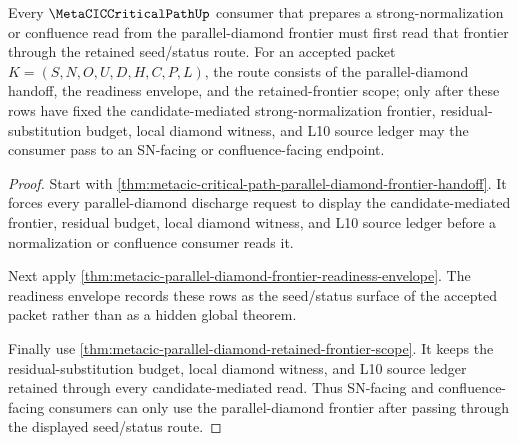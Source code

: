 \begin{theorem}
\label{thm:metacic-parallel-diamond-frontier-status-seed}
Every $\MetaCICCriticalPathUp$ consumer that prepares a strong-normalization or confluence read from the parallel-diamond frontier must first read that frontier through the retained seed/status route. For an accepted packet $K=(S,N,O,U,D,H,C,P,L)$, the route consists of the parallel-diamond handoff, the readiness envelope, and the retained-frontier scope; only after these rows have fixed the candidate-mediated strong-normalization frontier, residual-substitution budget, local diamond witness, and L10 source ledger may the consumer pass to an SN-facing or confluence-facing endpoint.
\end{theorem}
\begin{proof}
Start with \autoref{thm:metacic-critical-path-parallel-diamond-frontier-handoff}. It forces every parallel-diamond discharge request to display the candidate-mediated frontier, residual budget, local diamond witness, and L10 source ledger before a normalization or confluence consumer reads it.

Next apply \autoref{thm:metacic-parallel-diamond-frontier-readiness-envelope}. The readiness envelope records these rows as the seed/status surface of the accepted packet rather than as a hidden global theorem.

Finally use \autoref{thm:metacic-parallel-diamond-retained-frontier-scope}. It keeps the residual-substitution budget, local diamond witness, and L10 source ledger retained through every candidate-mediated read. Thus SN-facing and confluence-facing consumers can only use the parallel-diamond frontier after passing through the displayed seed/status route.
\end{proof}

